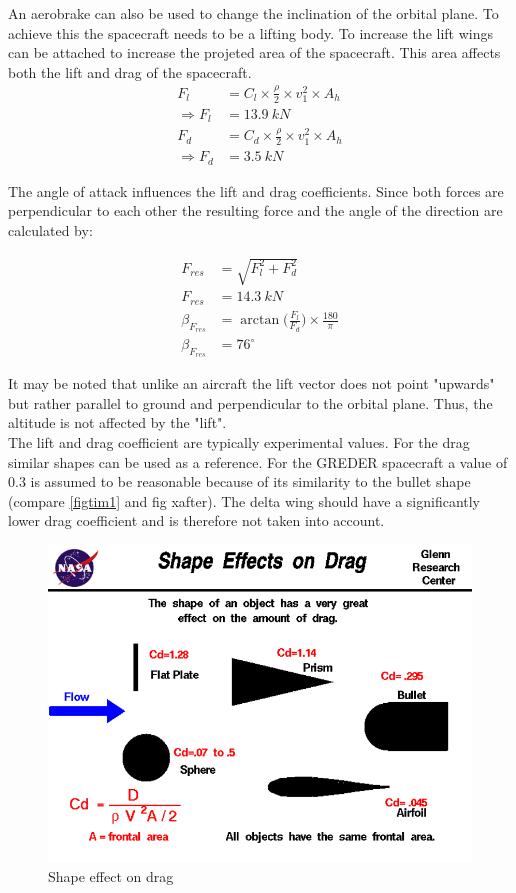 \qquad An aerobrake can also be used to change the inclination of the orbital plane. To achieve this the spacecraft needs to be a lifting body. To increase the lift wings can be attached to increase the projeted area of the spacecraft. This area affects both the lift and drag of the spacecraft.
\begin{align}
	F_l &= C_l\times\frac \rho 2 \times v_1^2 \times A_h\\
	\Rightarrow F_l &= 13.9\ kN\\
	F_d &= C_d\times\frac \rho 2 \times v_1^2 \times A_h\\
	\Rightarrow F_d &= 3.5\ kN
\end{align}

The angle of attack influences the lift and drag coefficients. Since both forces are perpendicular to each other the resulting force and the angle of the direction are calculated by:

\begin{align}
	F_{res} &= \sqrt{F_l^2+F_d^2}\\
	F_{res} &= 14.3\ kN\\
	\beta_{F_{res}} &=\arctan\bigg(\frac{F_l}{F_d}\bigg)\times\frac{180}\pi\\
	\beta_{F_{res}} &=76^\circ
\end{align}

It may be noted that unlike an aircraft the lift vector does not point "upwards" but rather parallel to ground and perpendicular to the orbital plane. Thus, the altitude is not affected by the "lift".\\

The lift and drag coefficient are typically experimental values. For the drag similar shapes can be used as a reference. For the GREDER spacecraft a value of 0.3 is assumed to be reasonable because of its similarity to the bullet shape (compare \autoref{figtim1} and fig xafter). The delta wing should have a significantly lower drag coefficient and is therefore not taken into account.
\begin{figure}[H]
	\centering\includegraphics[width=0.7\linewidth]{shapedrag}
	\caption{Shape effect on drag}
\end{figure}


